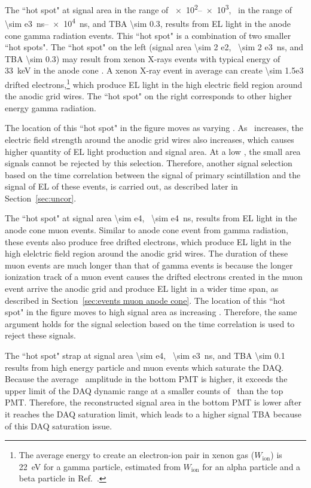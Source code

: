 The ``hot spot" at signal area in the range of \SIrange{e2}{e3}{\phe}, \rpd\ in the range of \SIrange{\sim e3}{e4}{\ns}, and TBA \num{\sim 0.3}, results from EL light in the anode cone gamma radiation events. This ``hot spot" is a combination of two smaller ``hot spots". The ``hot spot" on the left (signal area \SI{\sim 2 e2}{\phe}, \rpd\ \SI{\sim 2 e3}{\ns}, and TBA \num{\sim 0.3}) may result from xenon X-rays events with typical energy of \SI{33}{\keV} in the anode cone . A xenon X-ray event in average can create \num{\sim 1.5e3} drifted electrons,\footnote{The average energy to create an electron-ion pair in xenon gas ($W_\text{ion}$) is \SI{22}{\eV} for a gamma particle, estimated from $W_\text{ion}$ for an alpha particle and a beta particle in Ref.~\cite{Fano1963, Ahlen1980, Alvarez2013}.} which produce EL light in the high electric field region around the anodic grid wires. The ``hot spot" on the right corresponds to other higher energy gamma radiation.

The location of this ``hot spot"  in the figure moves as varying \opdv . As \opdv\ increases, the electric field strength around the anodic grid wires also increases, which causes higher quantity of EL light production and signal area. At a low \opdv , the small area signals cannot be rejected by this selection. Therefore, another signal selection based on the time correlation between the signal of primary scintillation and the signal of EL of these events, is carried out, as described later in Section~\ref{sec:uncor}.

The ``hot spot" at signal area \SI{\sim e4}{\phe}, \rpd\ \SI{\sim e4}{\ns}, results from EL light in the anode cone muon events. Similar to anode cone event from gamma radiation, these events also produce free drifted electrons, which produce EL light in the high elelctric field region around the anodic grid wires. The duration of these muon events are much longer than that of gamma events is because the longer ionization track of a muon event causes the drifted electrons created in the muon event arrive the anodic grid and produce EL light in a wider time span, as described in Section~\ref{sec:events muon anode cone}. The location of this ``hot spot"  in the figure moves to high signal area as increasing \opdv . Therefore, the same argument holds for the signal selection based on the time correlation is used to reject these signals. 

The ``hot spot" strap at signal area \SI{\sim e4}{\phe}, \rpd\ \SI{\sim e3}{\ns}, and TBA \num{\sim 0.1} results from high energy particle and muon events which saturate the DAQ. Because the average \sphe\ amplitude in the bottom PMT is higher, it exceeds the upper limit of the DAQ dynamic range at a smaller counts of \sphe\ than the top PMT. Therefore, the reconstructed signal area in the bottom PMT is lower after it reaches the DAQ saturation limit, which leads to a higher signal TBA because of this DAQ saturation issue.

